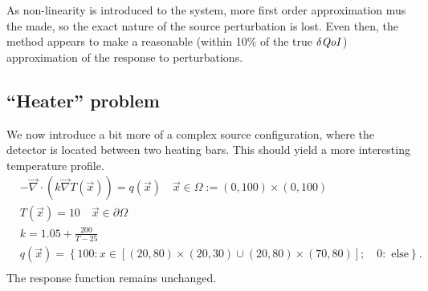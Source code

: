 \documentclass{article}
\newcommand{\vx}{\vec{x}}
\renewcommand{\div}{\vec{\nabla} \cdot}
\newcommand{\grad}{\vec{\nabla}}
\newcommand{\qoi}{{\it QoI}\xspace}
\begin{document}
As non-linearity is introduced to the system, more first order approximation mus the made, so the exact nature of the source perturbation is lost. Even then, the method appears to make a reasonable (within 10\% of the true $\delta \qoi$) approximation of the response to perturbations.

\subsection{``Heater'' problem }
We now introduce a bit more of a complex source configuration, where the detector is located between two heating bars. This should yield a more interesting temperature profile.
\begin{equation}
\label{case3}
\begin{split}
& - \div ( k \grad T(\vx) ) = q(\vx) \quad \vx \in \Omega := (0,100) \times (0,100) \\
&T(\vx)=10 \quad \vx \in \partial \Omega \\
& k = 1.05 + \frac{200}{T - 25} \\
& q(\vx) = \left\lbrace 100: x \in [(20,80) \times (20,30) \cup (20,80) \times (70,80) ]; \quad 0: \text{ else} \right\rbrace.\\
\end{split}
\end{equation}
The response function remains unchanged.
\end{document}
